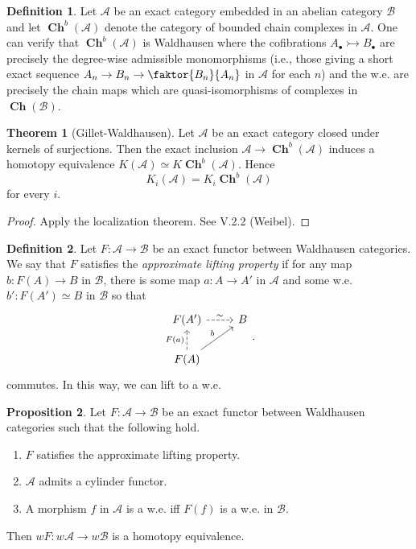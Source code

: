 \documentclass[10pt,letterpaper,cm]{nupset}
\theoremstyle{definition}
\newtheorem{definition}{Definition}
\theoremstyle{theorem}
\newtheorem{theorem}{Theorem}
\newtheorem{prop}[theorem]{Proposition}
\theoremstyle{remark}
\newcommand{\1}{\mathbf{1}}
\renewcommand{\a}{\mathscr{A}}
\renewcommand{\b}{\mathscr{B}}
\newcommand{\0}{\vec 0}
\DeclareMathOperator{\ch}{\mathbf{Ch}}
\begin{document}
\begin{definition}
Let $\a$ be an exact category embedded in an abelian category $\b$ and let $\ch^b(\a)$ denote the category of bounded chain complexes in $\a$. One can verify that $\ch^b(\a)$ is Waldhausen where the cofibrations $A_{\bullet} \rightarrowtail B_{\bullet}$ are precisely the degree-wise admissible monomorphisms (i.e., those giving a short exact sequence $A_n \to B_n \to \faktor{B_n}{A_n}$ in $\a$ for each $n$) and the w.e. are precisely the chain maps which are quasi-isomorphisms of complexes in $\ch(\b)$.
\end{definition}

\begin{theorem}[Gillet-Waldhausen]
Let $\a$ be an exact category closed under kernels of surjections. Then the exact inclusion $\a \to \ch^b(\a)$ induces a homotopy equivalence $K(\a) \simeq K\ch^b(\a)$. Hence $$K_i(\a) = K_i \ch^b(\a)$$ for every $i$.
\end{theorem}
\begin{proof}
Apply the localization theorem. See V.2.2 (Weibel).
\end{proof}

\begin{definition}
Let $F: \a \to \b$ be an exact functor between Waldhausen categories. We say that $F$ satisfies the \textit{approximate lifting property} if for any map $b: F(A) \to B$ in $\b$, there is some map $a : A \to A'$ in $\a$ and some w.e. $b' : F(A') \simeq B$ in $\b$ so that
\[
\begin{tikzcd}
F(A') \arrow[r, "\sim", dashed] & B \\
F(A) \arrow[u, "F(a)", dashed] \arrow[ru, "b"] & 
\end{tikzcd}.
\]
commutes. In this way, we can lift to  a w.e.
\end{definition}

\begin{prop}
Let $F: \a \to \b$ be an exact functor between Waldhausen categories such that the following hold.
\begin{enumerate}
\item $F$ satisfies the approximate lifting property.
\item $\a$ admits a cylinder functor.
\item A morphism $f$ in $\a$ is a w.e. iff $F(f)$ is a w.e. in $\b$.
\end{enumerate}
Then $wF : w \a \to w\b$ is a homotopy equivalence.
\end{prop}
\end{document}
